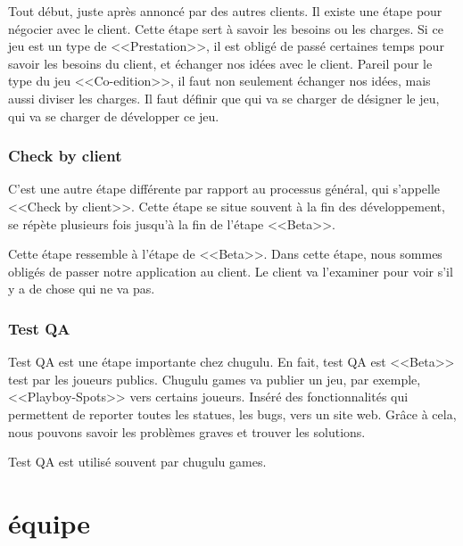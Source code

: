 Tout début, juste après annoncé par des autres clients. Il existe une étape pour négocier avec le client. Cette étape sert à savoir les besoins ou les charges. Si ce jeu est un type de <<Prestation>>, il est obligé de passé certaines temps pour savoir les besoins du client, et échanger nos idées avec le client. Pareil pour le type du jeu <<Co-edition>>, il faut non seulement échanger nos idées, mais aussi diviser les charges. Il faut définir que qui va se charger de désigner le jeu, qui va se charger de développer ce jeu.


\subsubsection{Check by client} %
\label{ssub:check_by_client}

C'est une autre étape différente par rapport au processus général, qui s'appelle <<Check by client>>. Cette étape se situe souvent à la fin des développement, se répète plusieurs fois jusqu'à la fin de l'étape <<Beta>>. 

Cette étape ressemble à l'étape de <<Beta>>. Dans cette étape, nous sommes obligés de passer notre application au client. Le client va l'examiner pour voir s'il y a de chose qui ne va pas.


\subsubsection{Test QA} %
\label{ssub:test_qa}

Test QA est une étape importante chez chugulu. En fait, test QA est <<Beta>> test par les joueurs publics. Chugulu games va publier un jeu, par exemple, <<Playboy-Spots>> vers certains joueurs. Inséré des fonctionnalités qui permettent de reporter toutes les statues, les bugs, vers un site web. Grâce à cela, nous pouvons savoir les problèmes graves et trouver les solutions.

Test QA est utilisé souvent par chugulu games.  


\section{équipe} %
\label{sec:Équipe}

